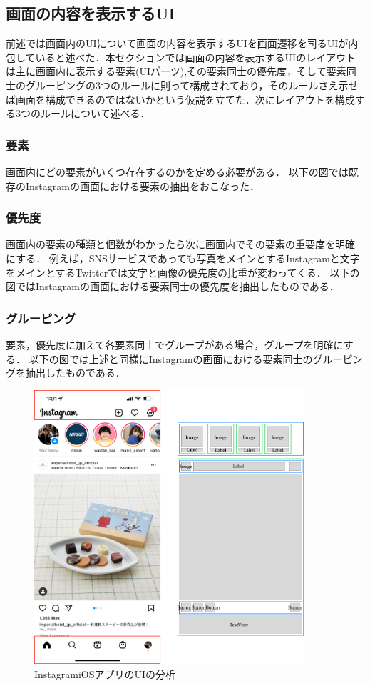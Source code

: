 \subsection{画面の内容を表示するUI}
前述では画面内のUIについて画面の内容を表示するUIを画面遷移を司るUIが内包していると述べた．本セクションでは画面の内容を表示するUIのレイアウトは主に画面内に表示する要素(UIパーツ),その要素同士の優先度，そして要素同士のグルーピングの3つのルールに則って構成されており，そのルールさえ示せば画面を構成できるのではないかという仮説を立てた．次にレイアウトを構成する3つのルールについて述べる．
\subsubsection{要素}
画面内にどの要素がいくつ存在するのかを定める必要がある．
以下の図では既存のInstagramの画面における要素の抽出をおこなった．
\subsubsection{優先度}
画面内の要素の種類と個数がわかったら次に画面内でその要素の重要度を明確にする．
例えば，SNSサービスであっても写真をメインとするInstagramと文字をメインとするTwitterでは文字と画像の優先度の比重が変わってくる．
以下の図ではInstagramの画面における要素同士の優先度を抽出したものである．

\subsubsection{グルーピング}
要素，優先度に加えて各要素同士でグループがある場合，グループを明確にする．
以下の図では上述と同様にInstagramの画面における要素同士のグルーピングを抽出したものである．


\begin{figure}[htbp]
  \begin{minipage}{\hsize}
    \begin{center}
       \includegraphics[width=100mm]{img/instagram_analyze.png}
    \end{center}
    \caption{InstagramiOSアプリのUIの分析}
    \label{fig:instagram_analyze}
  \end{minipage}
\end{figure}

